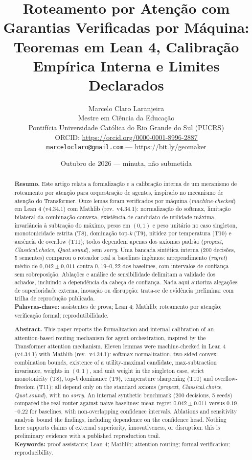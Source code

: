 \documentclass[12pt,a4paper]{article}
\title{Roteamento por Atenção com Garantias Verificadas por Máquina:\\
Teoremas em Lean 4, Calibração Empírica Interna e Limites Declarados}
\author{Marcelo Claro Laranjeira \\ Mestre em Ciência da Educação \\ Pontifícia Universidade Católica do Rio Grande do Sul (PUCRS) \\ ORCID: \url{https://orcid.org/0000-0001-8996-2887} \\ \texttt{marceloclaro@gmail.com} --- \url{https://bit.ly/geomaker}}
\date{Outubro de 2026 --- minuta, não submetida}
\begin{document}
\maketitle

\begin{abstract}
\textbf{Resumo.} Este artigo relata a formalização e a calibração interna de um
mecanismo de roteamento por atenção para orquestração de agentes, inspirado no
mecanismo de atenção do Transformer. Onze lemas foram verificados por máquina
(\textit{machine-checked}) em Lean 4 (v4.34.1) com Mathlib (rev.\ v4.34.1):
normalização do softmax, limitação bilateral da combinação convexa, existência
de candidato de utilidade máxima, invariância à subtração do máximo, pesos em
$(0,1)$ e peso unitário no caso singleton, monotonicidade estrita (T8),
dominação top-\textit{k} (T9), nitidez por temperatura (T10) e ausência de
overflow (T11); todos dependem apenas dos axiomas
padrão (\textit{propext}, \textit{Classical.choice}, \textit{Quot.sound}), sem
\textit{sorry}. Uma bancada sintética interna (200 decisões, 5 sementes)
comparou o roteador real a baselines ingênuos: arrependimento (\textit{regret})
médio de $0{,}042\pm0{,}011$ contra $0{,}19$--$0{,}22$ dos baselines, com
intervalos de confiança sem sobreposição. Ablações e análise de sensibilidade
delimitam a validade dos achados, incluindo a dependência da cabeça de
confiança. Nada aqui autoriza alegações de superioridade externa, inovação ou
disrupção: trata-se de evidência preliminar com trilha de reprodução publicada.
\\
\textbf{Palavras-chave:} assistentes de prova; Lean 4; Mathlib; roteamento por
atenção; verificação formal; reprodutibilidade.
\end{abstract}

\begin{abstract}
\textbf{Abstract.} This paper reports the formalization and internal
calibration of an attention-based routing mechanism for agent orchestration,
inspired by the Transformer attention mechanism. Eleven lemmas were
machine-checked in Lean 4 (v4.34.1) with Mathlib (rev.\ v4.34.1): softmax
normalization, two-sided convex-combination bounds, existence of a
utility-maximal candidate, max-subtraction invariance, weights in $(0,1)$,
and unit weight in the singleton case, strict monotonicity (T8), top-\textit{k}
dominance (T9), temperature sharpening (T10) and overflow-freedom (T11); all depend only on the standard axioms
(\textit{propext}, \textit{Classical.choice}, \textit{Quot.sound}), with no
\textit{sorry}. An internal synthetic benchmark (200 decisions, 5 seeds)
compared the real router against naive baselines: mean regret
$0.042\pm0.011$ versus $0.19$--$0.22$ for baselines, with non-overlapping
confidence intervals. Ablations and sensitivity analysis bound the findings,
including dependence on the confidence head. Nothing here supports claims of
external superiority, innovativeness, or disruption: this is preliminary
evidence with a published reproduction trail.
\\
\textbf{Keywords:} proof assistants; Lean 4; Mathlib; attention routing;
formal verification; reproducibility.
\end{abstract}
\end{document}
